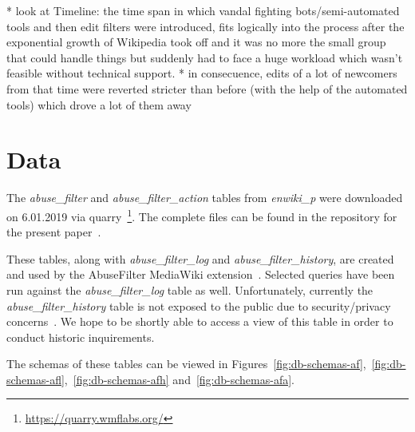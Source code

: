 * look at Timeline: the time span in which vandal fighting bots/semi-automated tools and then edit filters were introduced, fits logically into the process after the exponential growth of Wikipedia took off and it was no more the small group that could handle things but suddenly had to face a huge workload which wasn't feasible without technical support.
* in consecuence, edits of a lot of newcomers from that time were reverted stricter than before (with the help of the automated tools) which drove a lot of them away

\section{Data}

\begin{comment}
vgl \cite{GeiHal2017}
iterative mixed method
combination of:
* quantitative methods: mining big data sets/computational social science
"begin with one or
more large (but often thin) datasets generated by a software platform, which has recorded digital
traces that users leave in interacting on that platform. Such researchers then seek to mine as much
signal and significance from these found datasets as they can at scale in order to answer a research
question"
* more traditional social science/qualitative methods, e.g. interviews, observations, experiments
\end{comment}

The \emph{abuse\_filter} and \emph{abuse\_filter\_action} tables from \emph{enwiki\_p} were downloaded on 6.01.2019 via quarry~\footnote{\url{https://quarry.wmflabs.org/}}.
The complete files can be found in the repository for the present paper~\cite{github}. %

These tables, along with \emph{abuse\_filter\_log} and \emph{abuse\_filter\_history}, are created and used by the AbuseFilter MediaWiki extension~\cite{gerrit-abusefilter}.
Selected queries have been run against the \emph{abuse\_filter\_log} table as well.
Unfortunately, currently the \emph{abuse\_filter\_history} table is not exposed to the public due to security/privacy concerns~\cite{phabricator}.
We hope to be shortly able to access a view of this table in order to conduct historic inquirements.

The schemas of these tables can be viewed in Figures~\ref{fig:db-schemas-af},~\ref{fig:db-schemas-afl},~\ref{fig:db-schemas-afh} and~\ref{fig:db-schemas-afa}.

